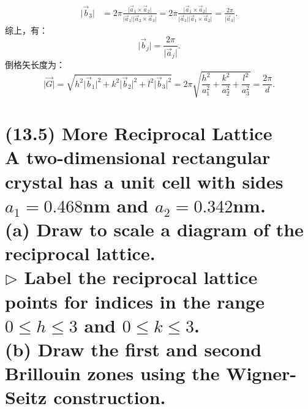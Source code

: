 \documentclass[reqno,a4paper,12pt]{amsart}
\begin{document}
\begin{tcolorbox}[breakable, colback = black!5!white, colframe = black]
\begin{enumerate}[(a)]
\begin{align*}
	\vert \vec{b}_3 \vert &= 2\pi \frac{\vert \vec{a}_1\times\vec{a}_2 \vert}{\vert \vec{a}_1 \vert \vert \vec{a}_2\times\vec{a}_3 \vert} = 2\pi\frac{\vert \vec{a}_1\times\vec{a}_2 \vert}{\vert \vec{a}_3 \vert \vert \vec{a}_1 \times \vec{a}_2 \vert} = \frac{2\pi}{\vert \vec{a}_3 \vert}.
\end{align*}
综上，有：
\[
	\vert \vec{b}_j \vert = \frac{2\pi}{\vert \vec{a}_j \vert}.
\]
倒格矢长度为：
\[
	\vert \vec{G} \vert = \sqrt{h^2 \vert \vec{b}_1 \vert^2 + k^2 \vert \vec{b}_2 \vert^2 + l^2 \vert \vec{b}_3 \vert^2} = 2\pi\sqrt{\frac{h^2}{a_1^2} + \frac{k^2}{a_2^2} + \frac{l^2}{a_3^2}} = \frac{2\pi}{d}.
\]
\end{enumerate}
\end{tcolorbox}

\section{\textbf{(13.5) More Reciprocal Lattice} \\
A two-dimensional rectangular crystal has a unit cell with sides $a_1 = 0.468$nm and $a_2 = 0.342$nm. \\
(a) Draw to scale a diagram of the reciprocal lattice. \\
$\triangleright$ Label the reciprocal lattice points for indices in the range $0 \leq h \leq 3$ and $0 \leq k \leq 3$. \\
(b) Draw the first and second Brillouin zones using the Wigner-Seitz construction. 
}
\end{document}
